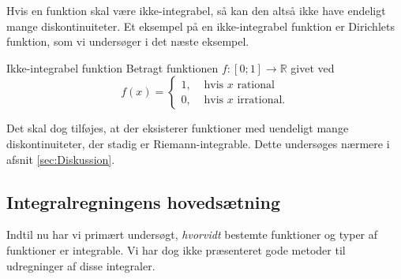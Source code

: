 Hvis en funktion skal være ikke-integrabel, så kan den altså ikke have endeligt mange diskontinuiteter.
Et eksempel på en ikke-integrabel funktion er Dirichlets funktion, som vi undersøger i det næste eksempel.

\begin{example}[label=exa:ikke-integrabel]{Ikke-integrabel funktion}{}
  Betragt funktionen $f:[0;1] \to \mathbb{R}$ givet ved
  \[
  f(x)= 
  \begin{cases}
    1, &\text{ hvis } x \text{ rational }\\
    0, &\text{ hvis } x \text{ irrational.}
  \end{cases}
  \] 
\end{example}

Det skal dog tilføjes, at der eksisterer funktioner med uendeligt mange diskontinuiteter, der stadig er Riemann-integrable.
Dette undersøges nærmere i afsnit \ref{sec:Diskussion}.

\subsection{Integralregningens hovedsætning}%
\label{sub:Integralregningens hovedsætning}
Indtil nu har vi primært undersøgt, \textit{hvorvidt} bestemte funktioner og typer af funktioner er integrable.
Vi har dog ikke præsenteret gode metoder til udregninger af disse integraler.


